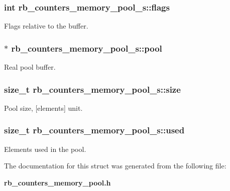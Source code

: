 \subsubsection[{flags}]{\setlength{\rightskip}{0pt plus 5cm}int rb\+\_\+counters\+\_\+memory\+\_\+pool\+\_\+s\+::flags}\label{structrb__counters__memory__pool__s_afb2ebc67257a860c5e19bc33a7735b32}


Flags relative to the buffer. 

\subsubsection[{pool}]{$\ast$ rb\+\_\+counters\+\_\+memory\+\_\+pool\+\_\+s\+::pool}\label{structrb__counters__memory__pool__s_a35c4d7d5ab4718a7841cbcffb3a23bc3}


Real pool buffer. 

\subsubsection[{size}]{\setlength{\rightskip}{0pt plus 5cm}size\+\_\+t rb\+\_\+counters\+\_\+memory\+\_\+pool\+\_\+s\+::size}\label{structrb__counters__memory__pool__s_a884d46240b78bb76ae0969006b3ff5df}


Pool size, [elements] unit. 

\subsubsection[{used}]{\setlength{\rightskip}{0pt plus 5cm}size\+\_\+t rb\+\_\+counters\+\_\+memory\+\_\+pool\+\_\+s\+::used}\label{structrb__counters__memory__pool__s_a52376ec30e09f9131677466d599433fe}


Elements used in the pool. 



The documentation for this struct was generated from the following file\+:\begin{DoxyCompactItemize}
\item 
{\bf rb\+\_\+counters\+\_\+memory\+\_\+pool.\+h}\end{DoxyCompactItemize}

